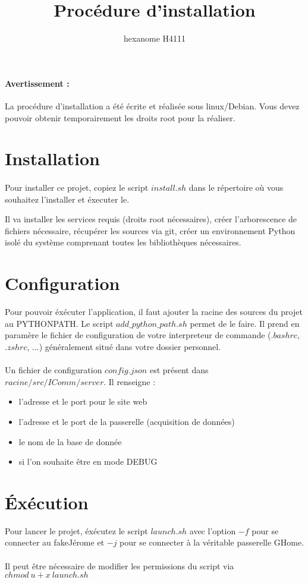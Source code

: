 \documentclass[10pt,a4paper]{article}
\author{hexanome H4111}
\title{Procédure d'installation}
\begin{document}
\paragraph{Avertissement : }La procédure d'installation a été écrite et réalisée sous linux/Debian. Vous devez pouvoir obtenir temporairement les droits root pour la réaliser.
\section{Installation}
\paragraph{} Pour installer ce projet, copiez le script $install.sh$ dans le répertoire où vous souhaitez l'installer et éxecuter le.

Il va installer les services requis (droits root nécessaires), créer l'arborescence de fichiers nécessaire, récupérer les sources via git, créer un environnement Python isolé du système comprenant toutes les bibliothèques nécessaires.

\section{Configuration}
Pour pouvoir éxécuter l'application, il faut ajouter la racine des sources du projet au PYTHONPATH. Le script $add\_python\_path.sh$ permet de le faire. Il prend en paramère le fichier de configuration de votre interpreteur de commande ($.bashrc$,$.zshrc$, ...) généralement situé dans votre dossier personnel.
\paragraph{} Un fichier de configuration $config.json$ est présent dans $racine/src/IComm/server$. Il renseigne  : 
\begin{itemize}
\item l'adresse et le port pour le site web
\item l'adresse et le port de la passerelle (acquisition de données)
\item le nom de la base de donnée
\item si l'on souhaite être en mode DEBUG
\end{itemize}
\section{\'{E}xécution}
Pour lancer le projet, éxécutez le script $launch.sh$ avec l'option $-f$ pour se connecter au fakeJérome et $-j$ pour se connecter à la véritable passerelle GHome.
\paragraph{}
\begin{small}
Il peut \^{e}tre nécessaire de modifier les permissions du script via $chmod \ u+x\ launch.sh$
\end{small}
\end{document}
